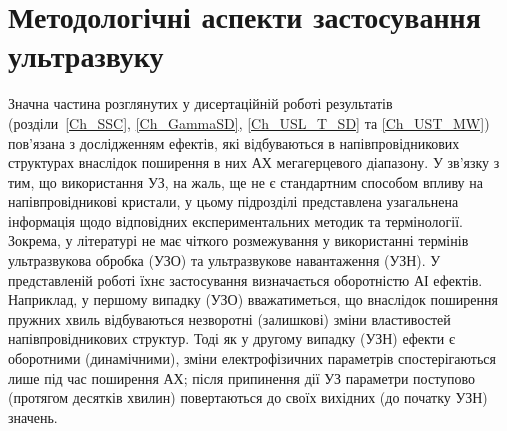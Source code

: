 %
%
%
%
%


\section{Методологічні аспекти застосування ультразвуку}

Значна частина розглянутих у дисертаційній роботі результатів (розділи~\ref{Ch_SSC}, \ref{Ch_GammaSD}, \ref{Ch_USL_T_SD} та \ref{Ch_UST_MW}) пов'язана з дослідженням ефектів, які відбуваються в напівпровідникових структурах внаслідок
поширення в них АХ мегагерцевого діапазону.
У зв'язку з тим, що використання УЗ, на жаль, ще не є стандартним способом впливу на напівпровідникові кристали,
у цьому підрозділі представлена узагальнена  інформація щодо відповідних експериментальних методик та термінології.
Зокрема, у літературі не має чіткого розмежування у використанні
термінів ультразвукова обробка (УЗО) та ультразвукове навантаження (УЗН).
У представленій роботі їхнє застосування визначається оборотністю АІ ефектів.
Наприклад, у першому випадку (УЗО) вважатиметься, що внаслідок поширення пружних хвиль відбуваються незворотні (залишкові) зміни властивостей напівпровідникових структур.
Тоді як у другому випадку (УЗН) ефекти є оборотними (динамічними), зміни електрофізичних параметрів спостерігаються лише під час поширення АХ;
після припинення дії УЗ параметри поступово (протягом десятків хвилин) повертаються до своїх вихідних (до початку УЗН) значень.

